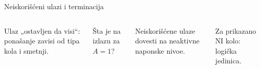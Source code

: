 \begin{frame}[label=10-s038]{Neiskorišćeni ulazi i terminacija}
\setlength{\abovedisplayskip}{4pt}\setlength{\belowdisplayskip}{4pt}\setlength{\abovedisplayshortskip}{3pt}\setlength{\belowdisplayshortskip}{3pt}
\begin{columns}[T,onlytextwidth]\raggedright
Ulaz „ostavljen da visi“: ponašanje zavisi od tipa kola i smetnji.\par
\par\smallskip
Šta je na izlazu za $A=1$?\centering {}\smallskip\par\smallskip
\raggedright Neiskorišćene ulaze dovesti na neaktivne naponske nivoe.\par
Za prikazano NI kolo: logička jedinica.\end{columns}\smallskip{}
\end{frame}
